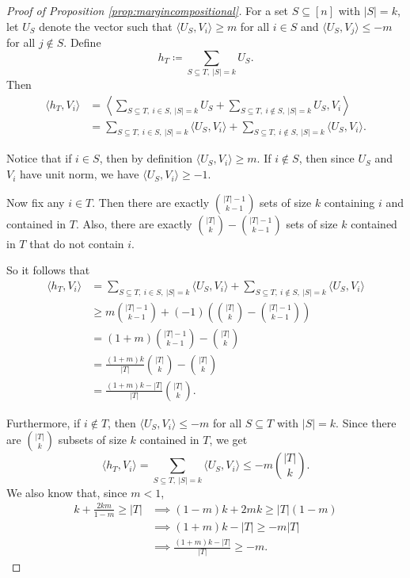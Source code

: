 \documentclass[preprint]{article}
\begin{document}
\begin{proof}[Proof of Proposition \ref{prop:margincompositional}]

For a set $S \subseteq [n]$ with $|S| = k$, let $U_S$ denote the vector such that $\langle U_S, V_i\rangle \geq m$ for all $i \in S$ and $\langle U_S, V_j\rangle \leq -m$ for all $j \notin S$. Define
$$
h_T \coloneqq \sum_{S \subseteq T,\ |S| = k} U_S.
$$
Then
\begin{align*}
\langle h_T, V_i\rangle
&=
\left\langle
\sum_{S \subseteq T,\ i \in S,\ |S| = k} U_S
+
\sum_{S \subseteq T,\ i \notin S,\ |S| = k} U_S,
V_i
\right\rangle\\
&=
\sum_{S \subseteq T,\ i \in S,\ |S| = k} \langle U_S, V_i\rangle
+
\sum_{S \subseteq T,\ i \notin S,\ |S| = k} \langle U_S, V_i\rangle.
\end{align*}

Notice that if $i \in S$, then by definition $\langle U_S, V_i\rangle \geq m$. If $i \notin S$, then since $U_S$ and $V_i$ have unit norm, we have $\langle U_S, V_i\rangle \geq -1$.

Now fix any $i \in T$. Then there are exactly
$\binom{|T|-1}{k-1}$ sets of size $k$ containing $i$ and contained in $T$. Also, there are exactly $\binom{|T|}{k} - \binom{|T|-1}{k-1}$ sets of size $k$ contained in $T$ that do not contain $i$.

So it follows that
\begin{align*}
\langle h_T, V_i\rangle
&=
\sum_{S \subseteq T,\ i \in S,\ |S| = k} \langle U_S, V_i\rangle
+
\sum_{S \subseteq T,\ i \notin S,\ |S| = k} \langle U_S, V_i\rangle \\
&\geq
m \binom{|T|-1}{k-1}
+
(-1)\left( \binom{|T|}{k} - \binom{|T|-1}{k-1}\right) \\
&=
(1+m)\binom{|T|-1}{k-1} - \binom{|T|}{k}\\
&=
\frac{(1+m)k}{|T|} \binom{|T|}{k} -  \binom{|T|}{k}\\
&=
\frac{(1+m)k - |T|}{|T|} \binom{|T|}{k}.
\end{align*}

Furthermore, if $i \notin T$, then $\langle U_S, V_i\rangle \leq -m$ for all $S \subseteq T$ with $|S| = k$. Since there are $\binom{|T|}{k}$ subsets of size $k$ contained in $T$, we get
$$
\langle h_T, V_i\rangle
=
\sum_{S \subseteq T,\ |S| = k} \langle U_S, V_i\rangle
\leq -m \binom{|T|}{k}.
$$
We also know that, since $m < 1$,
\begin{align*}
k + \frac{2km}{1-m} \geq |T|
&\implies (1-m)k + 2mk \geq |T|(1-m) \\
&\implies (1+m)k - |T| \geq -m|T| \\
&\implies \frac{(1+m)k - |T|}{|T|} \geq -m.
\end{align*}


\end{proof}
\end{document}
